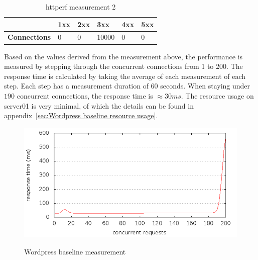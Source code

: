 \documentclass[Experiments]{subfiles}
\begin{document}
\begin{table}[H]
\caption{httperf measurement 2}
\begin{tabular}{|p{2cm}|p{}|p{}|p{}|p{}|p{}|}
\hline
 & \textbf{1xx} & \textbf{2xx} & \textbf{3xx} & \textbf{4xx} & \textbf{5xx} \\ \hline
\textbf{Connections} & 0 & 0 & 10000 & 0 & 0 \\ \hline
\end{tabular}
\label{fig:Baseline measurement 2}
\end{table}

Based on the values derived from the measurement above, the performance is measured by stepping through the concurrent connections from 1 to 200. The response time is calculated by taking the average of each measurement of  each step. Each step has a measurement duration of 60 seconds. When staying under $190$ concurrent connections, the response time is \mbox{$\approx 30 ms$}. The resource usage on server01 is very minimal, of which the details can be found in appendix~\ref{sec:Wordpress baseline resource usage}.

\begin{figure}[H]
\caption{Wordpress baseline measurement}
\centering
\includegraphics[scale=0.55] {images/results/baseline_wp/output.png}
\label{fig:Baseline performance measurement}
\end{figure}
\end{document}
